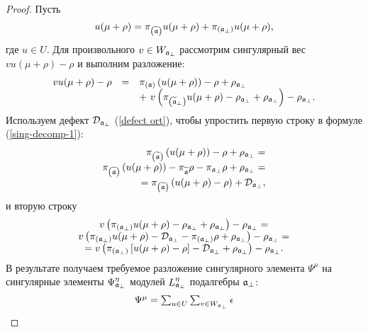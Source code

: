 \begin{proof}
Пусть
\[
u(\mu +\rho )=\pi _{\left( \widetilde{\mathfrak{a}}\right) }u(\mu +\rho )+\pi _{\left(
\frak{a}_{\perp }\right) }u(\mu +\rho ),
\]
где $u\in U$. Для произвольного  $v\in W_{\frak{a}_{\bot }}$ рассмотрим сингулярный вес  $vu(\mu +\rho )-\rho $ и выполним разложение:
\begin{equation}
\begin{array}{lcl}
vu(\mu +\rho )-\rho  & = & \pi _{\left( \frak{a}\right) }\left( u(\mu +\rho
)\right) -\rho +\rho _{\frak{a}_{\perp }}
\\
&  & +\ v\left( \pi _{\left( \aft_{\perp }\right) }u(\mu
+\rho )-\rho _{\frak{a}_{\perp }}+\rho _{\frak{a}_{\perp }}\right) -\rho _{%
\frak{a}_{\perp }} .
\end{array}
\label{sing-decomp-1}
\end{equation}
Используем дефект $\mathcal{D}_{\frak{a}_{\bot }}$ (\ref{defect ort}), чтобы упростить первую строку в формуле (\ref{sing-decomp-1}):
\[
\begin{array}{r}
\pi _{\left( \aft\right) }\left( u(\mu +\rho )\right) -\rho +\rho _{%
\frak{a}_{\perp }}= \\
\pi _{\left( \aft\right) }\left( u(\mu +\rho )\right) -\pi _{\aft%
}\rho -\pi _{\af_{\bot }}\rho +\rho _{\frak{a}_{\bot }}= \\
=\pi _{\left( \aft\right) }\left( u(\mu +\rho )-\rho \right) +\mathcal{D}%
_{\frak{a}_{\bot }},
\end{array}
\]
и вторую строку
\[
\begin{array}{c}
v\left( \pi _{\left( \frak{a}_{\perp }\right) }u(\mu +\rho
)-\rho _{\frak{a}_{\perp }}+\rho _{\frak{a}_{\perp }}\right) -\rho _{\frak{a}%
_{\perp }}= \\
v\left( \pi _{\left( \frak{a}_{\bot }\right) }u(\mu +\rho )-%
\mathcal{D}_{\frak{a}_{\bot }}-\pi _{\left( \frak{a}_{\bot }\right) }\rho
+\rho _{\frak{a}_{\bot }}\right)
-\rho _{\frak{a}_{\bot }}= \\
=v\left( \pi _{\left( \frak{a}_{\bot }\right) }\left[ u(\mu
+\rho )-\rho \right] -\mathcal{D}_{\frak{a}_{\bot }}+\rho _{\frak{a}_{\bot
}}\right) -\rho _{\frak{a}_{\bot }}.
\end{array}
\]
В результате получаем требуемое разложение сингулярного элемента $\Psi ^{\mu }$ на сингулярные элементы $\Psi_{\frak{a}_{\perp}}^{\eta}$ модулей $L_{\frak{a}_{\perp }}^{\eta }$ подалгебры $\frak{a}_{\perp }$: 
\begin{equation}
\begin{array}{l}
\Psi ^{\mu }=\sum_{u\in U}\sum_{v\in W_{\frak{a}_{\perp }}}\epsilon

\end{array}
\end{equation}
\end{proof}

